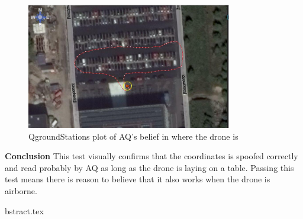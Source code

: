 \begin{figure}[H]
    \center
    \includegraphics[width=0.8\textwidth]{graphics/test_qground_plot.eps}
  \caption{QgroundStations plot of AQ's belief in where the drone is}   \label{fig:test_qground_plot}
\end{figure}

\textbf{Conclusion}
This test visually confirms that the coordinates is spoofed correctly and read probably by AQ as long as the drone is laying on a table. Passing this test means there is reason to believe that it also works when the drone is airborne.

bstract.tex
